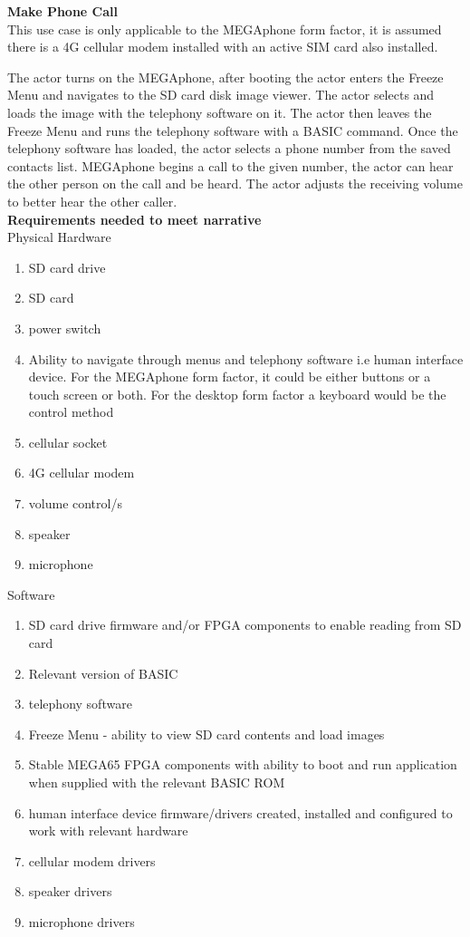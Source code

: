 \textbf{Make Phone Call}\\
This use case is only applicable to the MEGAphone form factor, it is assumed there is a 4G cellular modem installed with an active SIM card also installed.

The actor turns on the MEGAphone, after booting the actor enters the Freeze Menu and navigates to the SD card disk image viewer. The actor selects and loads the image with the telephony software on it. The actor then leaves the Freeze Menu and runs the telephony software with a BASIC command. Once the telephony software has loaded, the actor selects a phone number from the saved contacts list. MEGAphone begins a call to the given number, the actor can hear the other person on the call and be heard. The actor adjusts the receiving volume to better hear the other caller.\\

\textbf{Requirements needed to meet narrative}\\
Physical Hardware
\begin{enumerate}
\item SD card drive
\item SD card
\item power switch
\item Ability to navigate through menus and telephony software i.e human interface device. For the MEGAphone form factor, it could be either buttons or a touch screen or both. For the desktop form factor a keyboard would be the control method
\item cellular socket
\item 4G cellular modem
\item volume control/s
\item speaker
\item microphone
\end{enumerate}

Software\\
\begin{enumerate}
\item SD card drive firmware and/or FPGA components to enable reading from SD card
\item Relevant version of BASIC 
\item telephony software
\item Freeze Menu - ability to view SD card contents and load images
\item Stable MEGA65 FPGA components with ability to boot and run application when supplied with the relevant BASIC ROM
\item human interface device firmware/drivers created, installed and configured to work with relevant hardware
\item cellular modem drivers
\item speaker drivers
\item microphone drivers
\end{enumerate}

